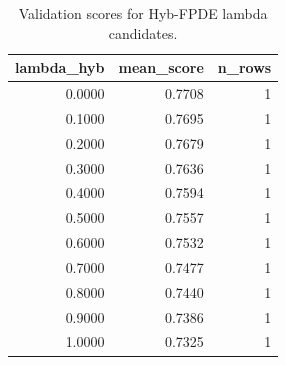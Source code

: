 \begin{table}[t]
\caption{Validation scores for Hyb-FPDE lambda candidates.}
\label{tab:lambda_distribution_computed}
\centering
\begin{tabular}{rrr}
\toprule
lambda\_hyb & mean\_score & n\_rows \\
\midrule
0.0000 & 0.7708 & 1 \\
0.1000 & 0.7695 & 1 \\
0.2000 & 0.7679 & 1 \\
0.3000 & 0.7636 & 1 \\
0.4000 & 0.7594 & 1 \\
0.5000 & 0.7557 & 1 \\
0.6000 & 0.7532 & 1 \\
0.7000 & 0.7477 & 1 \\
0.8000 & 0.7440 & 1 \\
0.9000 & 0.7386 & 1 \\
1.0000 & 0.7325 & 1 \\
\bottomrule
\end{tabular}

\end{table}
